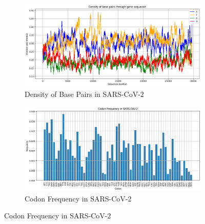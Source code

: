 \documentclass{article}
\begin{document}
\begin{figure}[h]
    \centering
    \begin{subfigure}[t]{0.45\textwidth}
        \centering
        \includegraphics[width=\textwidth]{../code/density.png}
        \caption{Density of Base Pairs in SARS-CoV-2}
        \label{fig:density}
    \end{subfigure}
    \hfill
    \begin{subfigure}[t]{0.45\textwidth}
        \centering
        \includegraphics[width=\textwidth]{../code/histoSC2.png}
        \caption{Codon Frequency in SARS-CoV-2}
        \label{fig:histosc2}
    \end{subfigure}

    \vspace{1em}  %


\end{figure}
\end{document}
